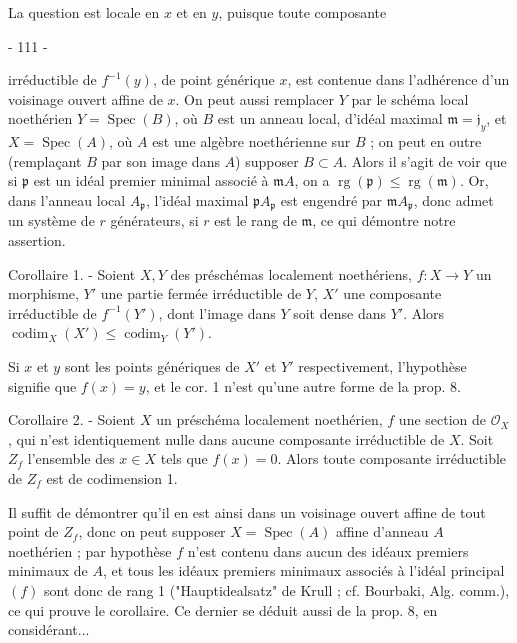 La question est locale en $x$ et en $y$, puisque toute composante

\newpage


- 111 -

irréductible de $f^{-1}(y)$, de point générique $x$, est contenue dans l'adhérence d'un voisinage ouvert affine de $x$. On peut aussi remplacer $Y$ par le schéma local noethérien $Y = \operatorname{Spec}(B)$, où $B$ est un anneau local, d'idéal maximal $\mathfrak{m} = \mathfrak{j}_y$, et $X = \operatorname{Spec}(A)$, où $A$ est une algèbre noethérienne sur $B$ ; on peut en outre (remplaçant $B$ par son image dans $A$) supposer $B \subset A$. Alors il s'agit de voir que si $\mathfrak{p}$ est un idéal premier minimal associé à $\mathfrak{m}A$, on a $\operatorname{rg}(\mathfrak{p}) \le \operatorname{rg}(\mathfrak{m})$. Or, dans l'anneau local $A_{\mathfrak{p}}$, l'idéal maximal $\mathfrak{p}A_{\mathfrak{p}}$ est engendré par $\mathfrak{m}A_{\mathfrak{p}}$, donc admet un système de $r$ générateurs, si $r$ est le rang de $\mathfrak{m}$, ce qui démontre notre assertion.

Corollaire 1. - Soient $X, Y$ des préschémas localement noethériens, $f: X \to Y$ un morphisme, $Y'$ une partie fermée irréductible de $Y$, $X'$ une composante irréductible de $f^{-1}(Y')$, dont l'image dans $Y$ soit dense dans $Y'$. Alors $\operatorname{codim}_X(X') \le \operatorname{codim}_Y(Y')$.

Si $x$ et $y$ sont les points génériques de $X'$ et $Y'$ respectivement, l'hypothèse signifie que $f(x) = y$, et le cor. 1 n'est qu'une autre forme de la prop. 8.

Corollaire 2. - Soient $X$ un préschéma localement noethérien, $f$ une section de $\mathcal{O}_X$, qui n'est identiquement nulle dans aucune composante irréductible de $X$. Soit $Z_f$ l'ensemble des $x \in X$ tels que $f(x) = 0$. Alors toute composante irréductible de $Z_f$ est de codimension 1.

Il suffit de démontrer qu'il en est ainsi dans un voisinage ouvert affine de tout point de $Z_f$, donc on peut supposer $X = \operatorname{Spec}(A)$ affine d'anneau $A$ noethérien ; par hypothèse $f$ n'est contenu dans aucun des idéaux premiers minimaux de $A$, et tous les idéaux premiers minimaux associés à l'idéal principal $(f)$ sont donc de rang 1 ("Hauptidealsatz" de Krull ; cf. Bourbaki, Alg. comm.), ce qui prouve le corollaire. Ce dernier se déduit aussi de la prop. 8, en considérant...

